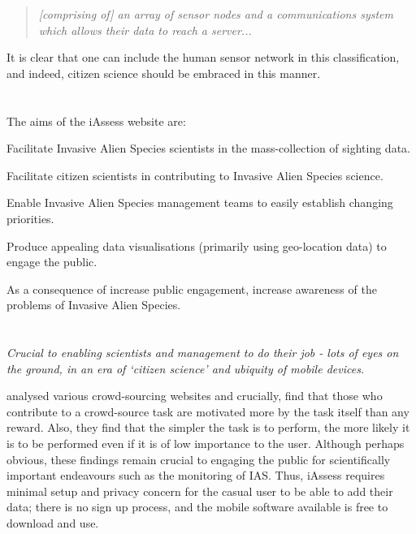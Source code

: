 \documentclass[10pt,psfig,letterpaper,twocolumn]{article}
\begin{document}
\begin{quote}\em{\footnotesize
[comprising of] an array of sensor nodes and a communications system which allows their data to reach a server...
}
\end{quote}

It is clear that one can include the human sensor network in this classification, and indeed, citizen science should be embraced in this manner.

\section*{}

The aims of the iAssess website are:
\begin{enumerate*}
\item Facilitate Invasive Alien Species scientists in the mass-collection of sighting data.
\item Facilitate citizen scientists in contributing to Invasive Alien Species science.
\item Enable Invasive Alien Species management teams to easily establish changing priorities.
\item Produce appealing data visualisations (primarily using geo-location data) to engage the public.
\item As a consequence of increase public engagement, increase awareness of the problems of Invasive Alien Species.
\end{enumerate*}

\section*{}

\emph{Crucial to enabling scientists and management to do their job - lots of eyes on the ground, in an era of `citizen science' and ubiquity of mobile devices.}

\citet{Wightman:2010un} analysed various crowd-sourcing websites and crucially, find that those who contribute to a crowd-source task are motivated more by the task itself than any reward. Also, they find that the simpler the task is to perform, the more likely it is to be performed even if it is of low importance to the user. Although perhaps obvious, these findings remain crucial to engaging the public for scientifically important endeavours such as the monitoring of IAS. Thus, iAssess requires minimal setup and privacy concern for the casual user to be able to add their data; there is no sign up process, and the mobile software available is free to download and use.
\end{document}
